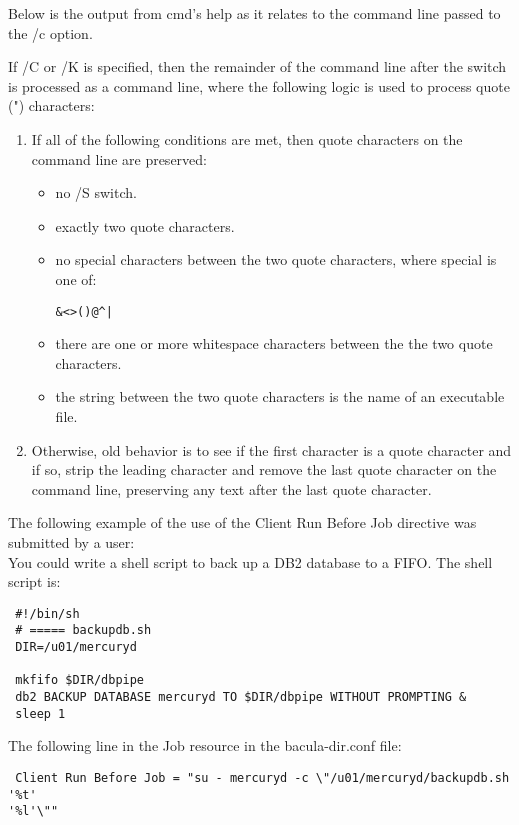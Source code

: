 \begin{description}
Below is the output from cmd's help as it relates to the command line
passed to the /c option.
 
 
 If /C or /K is specified, then the remainder of the command line after
 the switch is processed as a command line, where the following logic is
 used to process quote (") characters:
 
\begin{enumerate}
\item 
     If all of the following conditions are met, then quote characters
         on the command line are preserved:
    \begin{itemize}
       \item no /S switch.
       \item exactly two quote characters.
       \item no special characters between the two quote characters,
           where special is one of: 
\begin{verbatim}
&<>()@^| 
\end{verbatim}
       \item there are one or more whitespace characters between the
           the two quote characters.
       \item the string between the two quote characters is the name
           of an executable file.
    \end{itemize}
 
\item  Otherwise, old behavior is to see if the first character is
         a quote character and if so, strip the leading character and
         remove the last quote character on the command line, preserving
         any text after the last quote character. 
   
\end{enumerate}

   
The following example of the use of the Client Run Before Job directive was 
submitted by a user:\\
You could write a shell script to back up a DB2 database to a FIFO. The shell
script is:

\footnotesize
\begin{verbatim}
 #!/bin/sh
 # ===== backupdb.sh
 DIR=/u01/mercuryd
 
 mkfifo $DIR/dbpipe
 db2 BACKUP DATABASE mercuryd TO $DIR/dbpipe WITHOUT PROMPTING &
 sleep 1
\end{verbatim}
\normalsize
 
The following line in the Job resource in the bacula-dir.conf file:
\footnotesize
\begin{verbatim}
 Client Run Before Job = "su - mercuryd -c \"/u01/mercuryd/backupdb.sh '%t'
'%l'\""
\end{verbatim}
\normalsize


\end{description}
